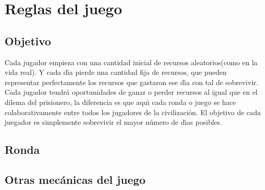 \documentclass{article}
\begin{document}
\section{Reglas del juego}
\vspace*{5mm}
\subsection*{Objetivo}
Cada jugador empieza con una cantidad inicial de recursos aleatorios(como en la vida real). Y cada d\'{\i}a pierde una cantidad fija de recursos, que pueden
representar perfectamente los recursos que gastaron ese d\'{\i}a con tal de sobrevivir. Cada jugador tendr\'a oportunidades de ganar o perder recursos al igual
que en el dilema del prisionero, la diferencia es que aqu\'{\i} cada ronda o juego se hace colaborativamente entre todos los jugadores de la civilizaci\'on.
El objetivo de cada juegador es simplemente sobrevivir el mayor n\'umero de d\'{\i}as posibles.

\subsection*{Ronda}

\subsection*{Otras mec\'anicas del juego}
\end{document}

